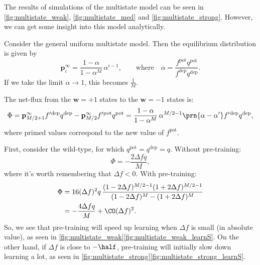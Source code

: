 \documentclass[12pt]{article}
\newcommand{\pr}{\mathbf{p}}
\newcommand{\eq}{\pr^\infty}
\newcommand{\w}{\mathbf{w}}
\newcommand{\pot}{^{\text{pot}}}
\newcommand{\dep}{^{\text{dep}}}
\begin{document}




The results of simulations of the multistate model can be seen in \autoref{fig:multistate_weak}, \autoref{fig:multistate_med} and \autoref{fig:multistate_strong}.
However, we can get some insight into this model analytically.



Consider the general uniform multistate model.
Then the equilibrium distribution is given by
%
\begin{equation}\label{eq:mutltieq}
  \eq_i = \frac{1-\alpha}{1-\alpha^M}\,\alpha^{i-1},
  \qquad \text{where} \quad
  \alpha=\frac{f\pot q\pot}{f\dep q\dep}.
\end{equation}
%
If we take the limit $\alpha\rightarrow1$, this becomes $\frac{1}{M}$.

The net-flux from the $\w=+1$ states to the $\w=-1$ states is:
%
\begin{equation}\label{eq:multiflux}
  \Phi = \eq_{M/2+1}f'{}\dep q\dep - \eq_{M/2}f'{}\pot q\pot = \frac{1-\alpha}{1-\alpha^M}\,\alpha^{M/2-1}\prn{\alpha-\alpha'}f'{}\dep q\dep,
\end{equation}
%
where primed values correspond to the new value of $f\pot$.

First, consider the wild-type, for which $q\pot=q\dep=q$.
Without pre-training:
%
\begin{equation}\label{eq:multiWTnopre}
  \Phi = -\frac{2\Delta fq}{M},
\end{equation}
%
where it's worth remembering that $\Delta f<0$.
With pre-training:
%
\begin{equation}\label{eq:multiWTpre}
\begin{aligned}
  \Phi &= 16(\Delta f)^2q \, \frac{(1-2\Delta f)^{M/2-1} (1+2\Delta f)^{M/2-1}}
          {(1-2\Delta f)^M - (1+2\Delta f)^M} \\
       &= -\frac{4\Delta fq}{M} + \CO(\Delta f)^2.
\end{aligned}
\end{equation}
%
So, we see that pre-training will speed up learning when $\Delta f$ is small (in absolute value), as seen in \autoref{fig:multistate_weak}\ref{fig:multistate_weak_learnS}.
On the other hand, if $\Delta f$ is close to $-\half$, pre-training will initially slow down learning a lot, as seen in \autoref{fig:multistate_strong}\ref{fig:multistate_strong_learnS}.
\end{document}
